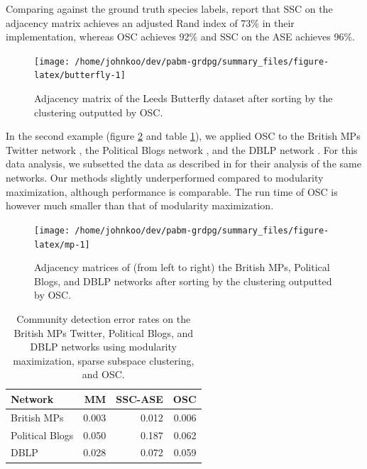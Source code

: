 \documentclass[
  11pt,
]{article}
\theoremstyle{definition}
\theoremstyle{definition}
\theoremstyle{definition}
\theoremstyle{definition}
\theoremstyle{remark}
\begin{document}
Comparing against the ground truth species labels, \citet{noroozi2019estimation}
report that SSC on the adjacency matrix achieves an adjusted Rand index of 73\% in their implementation, whereas OSC achieves 92\% and SSC on the ASE achieves 96\%.

\begin{figure}[H]

{\centering \texttt{[image: /home/johnkoo/dev/pabm-grdpg/summary\_files/figure-latex/butterfly-1]}

}

\caption{Adjacency matrix of the Leeds Butterfly dataset 
after sorting by the clustering outputted by OSC.}\label{fig:butterfly}
\end{figure}

In the second example (figure \ref{fig:mp} and table \ref{tab:unnamed-chunk-6}), we applied OSC to the British MPs Twitter network
\citep{greene2013producing}, the Political Blogs network
\citep{10.1145/1134271.1134277}, and the DBLP network
\citep{NIPS2009_3855, 10.1007/978-3-642-15880-3_42}.
For this data analysis, we subsetted the data as described in
\citet{307cbeb9b1be48299388437423d94bf1} for their analysis of the
same networks. Our methods slightly underperformed compared to modularity
maximization, although performance is comparable.
The run time of OSC is however much smaller than that of modularity maximization.

\begin{figure}[H]
{\centering \texttt{[image: /home/johnkoo/dev/pabm-grdpg/summary\_files/figure-latex/mp-1]}
}
\caption{Adjacency matrices of (from left to right) the British MPs, Political Blogs, and DBLP networks after sorting by the clustering outputted by OSC.}\label{fig:mp}
\end{figure}

\begin{table}[H]
\centering
\begin{tabular}[t]{l|r|r|r}
\hline
Network & MM & SSC-ASE & OSC\\
\hline
British MPs & 0.003 & 0.012 & 0.006\\
\hline
Political Blogs & 0.050 & 0.187 & 0.062\\
\hline
DBLP & 0.028 & 0.072 & 0.059\\
\hline
\end{tabular}
\caption{\label{tab:unnamed-chunk-6}Community detection error rates on the British MPs Twitter, Political Blogs, and DBLP networks using modularity maximization, sparse subspace clustering, and OSC.}
\end{table}
\end{document}

